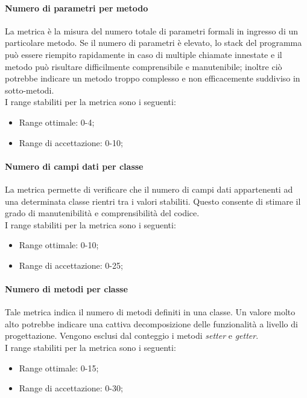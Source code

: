 			\paragraph{Numero di parametri per metodo}
			La metrica è la misura del numero totale di parametri formali in ingresso di un particolare metodo. Se il numero di parametri è elevato, lo stack del programma può essere riempito rapidamente in caso di multiple chiamate innestate e il metodo può risultare difficilmente comprensibile e manutenibile; inoltre ciò potrebbe indicare un metodo troppo complesso e non efficacemente suddiviso in sotto-metodi.
			\\I range stabiliti per la metrica sono i seguenti:
			\begin{itemize}
				\item Range ottimale: 0-4;
				\item Range di accettazione: 0-10;
			\end{itemize}
			
			\paragraph{Numero di campi dati per classe}
			La metrica permette di verificare che il numero di campi dati appartenenti ad una determinata classe rientri tra i valori stabiliti. Questo consente di stimare il grado di manutenibilità e comprensibilità del codice.
			\\I range stabiliti per la metrica sono i seguenti:
			\begin{itemize}
				\item Range ottimale: 0-10;
				\item Range di accettazione: 0-25;
			\end{itemize}
			
			\paragraph{Numero di metodi per classe}
			Tale metrica indica il numero di metodi definiti in una classe. Un valore molto alto potrebbe indicare una cattiva decomposizione delle funzionalità a livello di progettazione. Vengono esclusi dal conteggio i metodi \textit{setter} e \textit{getter}.
			\\I range stabiliti per la metrica sono i seguenti:
			\begin{itemize}
				\item Range ottimale: 0-15;
				\item Range di accettazione: 0-30;
			\end{itemize}
			
